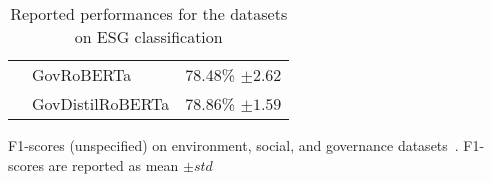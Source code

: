 \begin{table*}[ht]
\begin{subtable}[t]{0.50\textwidth}
{\begin{tabular}{llc}
        \citet{schimanski_bridging_2023} & GovRoBERTa                      & 78.48\% $\pm 2.62$ \\
        \citet{schimanski_bridging_2023} & GovDistilRoBERTa                & 78.86\% $\pm 1.59$ \\
        \bottomrule
        \end{tabular}
    }
        \caption{F1-scores (unspecified) on environment, social, and governance datasets~\cite{Schimanski2024nature}. F1-scores are reported as mean $\pm std$}
        \label{tab:f1_scores_env_social_gov}
    \end{subtable}
    
    \caption{Reported performances for the datasets on ESG classification}
    \label{tab:reported perf esg}
\end{table*}    

